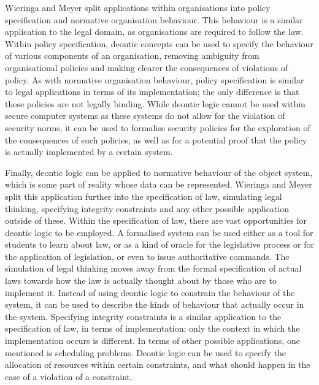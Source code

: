 \documentclass{l4proj}
\begin{document}
Wieringa and Meyer split applications within organisations into policy specification and normative organisation behaviour. This behaviour is a similar application to the legal domain, as organisations are required to follow the law. Within policy specification, deontic concepts can be used to specify the behaviour of various components of an organisation, removing ambiguity from organisational policies and making clearer the consequences of violations of policy. As with normative organisation behaviour, policy specification is similar to legal applications in terms of its implementation; the only difference is that these policies are not legally binding. While deontic logic cannot be used within secure computer systems as these systems do not allow for the violation of security norms, it can be used to formalise security policies for the exploration of the consequences of such policies, as well as for a potential proof that the policy is actually implemented by a certain system. 

Finally, deontic logic can be applied to normative behaviour of the object system, which is some part of reality whose data can be represented. Wieringa and Meyer split this application further into the specification of law, simulating legal thinking, specifying integrity constraints and any other possible application outside of these. Within the specification of law, there are vast opportunities for deontic logic to be employed. A formalised system can be used either as a tool for students to learn about law, or as a kind of oracle for the legislative process or for the application of legislation, or even to issue authoritative commands. The simulation of legal thinking moves away from the formal specification of actual laws towards how the law is actually thought about by those who are to implement it. Instead of using deontic logic to constrain the behaviour of the system, it can be used to describe the kinds of behaviour that actually occur in the system. Specifying integrity constraints is a similar application to the specification of law, in terms of implementation; only the context in which the implementation occurs is different. In terms of other possible applications, one mentioned is scheduling problems. Deontic logic can be used to specify the allocation of resources within certain constraints, and what should happen in the case of a violation of a constraint. 
\end{document}
